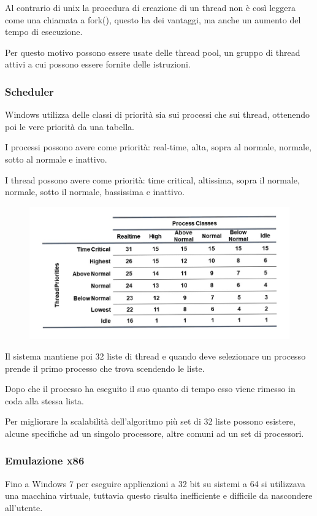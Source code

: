 Al contrario di unix la procedura di creazione di un thread non è così leggera come una chiamata a fork(), questo ha dei vantaggi, ma anche un aumento del tempo di esecuzione.

Per questo motivo possono essere usate delle thread pool, un gruppo di thread attivi a cui possono essere fornite delle istruzioni.

\subsubsection{Scheduler}
Windows utilizza delle classi di priorità sia sui processi che sui thread, ottenendo poi le vere priorità da una tabella.

I processi possono avere come priorità: real-time, alta, sopra al normale, normale, sotto al normale e inattivo.

I thread possono avere come priorità: time critical, altissima, sopra il normale, normale, sotto il normale, bassissima e inattivo.

\begin{figure}[H]
    \centering
    \includegraphics[width=0.75\linewidth]{assets/Windows-priority.jpeg}
\end{figure}

Il sistema mantiene poi 32 liste di thread e quando deve selezionare un processo prende il primo processo che trova scendendo le liste.

Dopo che il processo ha eseguito il suo quanto di tempo esso viene rimesso in coda alla stessa lista.

\spacer
Per migliorare la scalabilità dell'algoritmo più set di 32 liste possono esistere, alcune specifiche ad un singolo processore, altre comuni ad un set di processori.

\subsubsection{Emulazione x86}
Fino a Windows 7 per eseguire applicazioni a 32 bit su sistemi a 64 si utilizzava una macchina virtuale, tuttavia questo risulta inefficiente e difficile da nascondere all'utente.

